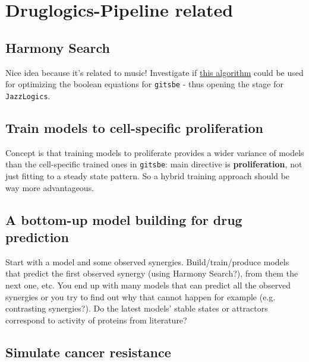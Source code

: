 \documentclass[12pt,]{book}
\begin{document}
\hypertarget{druglogics-pipeline-related}{%
\section{Druglogics-Pipeline related}\label{druglogics-pipeline-related}}

\hypertarget{harmony-search}{%
\subsection{Harmony Search}\label{harmony-search}}

Nice idea because it's related to music!
Investigate if \href{https://doi.org/10.1016/j.proeng.2016.07.510}{this algorithm}
could be used for optimizing the boolean equations for \texttt{gitsbe} - thus opening the
stage for \texttt{JazzLogics}.

\hypertarget{train-models-to-cell-specific-proliferation}{%
\subsection{Train models to cell-specific proliferation}\label{train-models-to-cell-specific-proliferation}}

Concept is that training models to proliferate provides a wider variance of models than the
cell-specific trained ones in \texttt{gitsbe}: main directive is \textbf{proliferation},
not just fitting to a steady state pattern. So a hybrid training approach should
be way more advantageous.

\hypertarget{a-bottom-up-model-building-for-drug-prediction}{%
\subsection{A bottom-up model building for drug prediction}\label{a-bottom-up-model-building-for-drug-prediction}}

Start with a model and some observed synergies. Build/train/produce models that
predict the first observed synergy (using Harmony Search?), from them the next
one, etc. You end up with many models that can predict all the observed
synergies or you try to find out why that cannot happen for example (e.g.~
contrasting synergies?). Do the latest models' stable states or attractors
correspond to activity of proteins from literature?

\hypertarget{simulate-cancer-resistance}{%
\subsection{Simulate cancer resistance}\label{simulate-cancer-resistance}}
\end{document}
